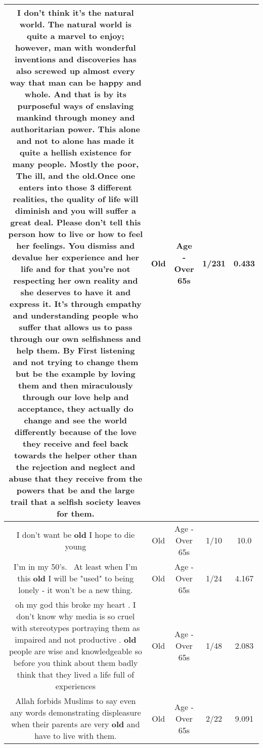 \documentclass[11pt]{article}
\newlength\mylength
\begin{document}
\begin{center}
\begin{longtable}{|C{.65\mylength}|C{.30\mylength}|C{.12\mylength}|C{.12\mylength}|C{.12\mylength}|}
  \small I don't think it's the natural world. The natural world is quite a marvel to enjoy; however, man with wonderful inventions and discoveries has also screwed up almost every way that man can be happy and whole. And that is by its purposeful ways of enslaving mankind through money and authoritarian power. This alone and not to alone has made it quite a hellish existence for many people.  Mostly the poor, The ill, and the \textbf{old}.Once one enters into those 3 different realities, the quality of life will diminish and you will suffer a great deal. Please don't tell this person how to live or how to feel her feelings. You dismiss and devalue her experience and her life and for that you're not respecting her own reality and she deserves to have it and express it. It's through empathy and understanding people who suffer that allows us to pass through our own selfishness and help them. By First listening and not trying to change them but be the example by loving them and then miraculously through our love help and acceptance, they actually do change and see the world differently because of the love they receive and feel back towards the helper other than the rejection and neglect and abuse that they receive from the powers that be and the large trail that a selfish society leaves for them.\normalsize   & Old & Age - Over 65s & 1/231 & 0.433 \\  \hline
  \small I don't want be \textbf{old} I hope to die young\normalsize   & Old & Age - Over 65s & 1/10 & 10.0 \\  \hline
  \small I'm in my 50's.  At least when I'm this \textbf{old} I will be "used" to being lonely - it won't be a new thing.\normalsize   & Old & Age - Over 65s & 1/24 & 4.167 \\  \hline
  \small oh my god this broke my heart . I don't know why media is so cruel with stereotypes portraying them as impaired and not productive . \textbf{old} people are wise and knowledgeable so before you think about them badly think that they lived a life full of experiences\normalsize   & Old & Age - Over 65s & 1/48 & 2.083 \\  \hline
  \small Allah forbids Muslims to say even any words demonstrating displeasure when their parents are very \textbf{old} and have to live with them.\normalsize   & Old & Age - Over 65s & 2/22 & 9.091 \\  \hline

\end{longtable}
\end{center}
\end{document}
